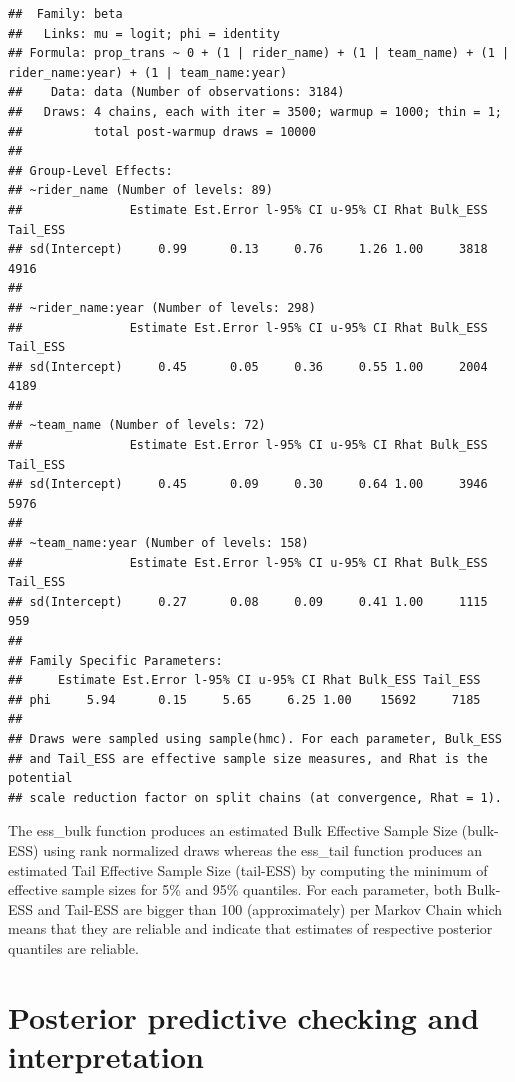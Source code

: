 \documentclass[
]{article}
\begin{document}
\begin{verbatim}
##  Family: beta 
##   Links: mu = logit; phi = identity 
## Formula: prop_trans ~ 0 + (1 | rider_name) + (1 | team_name) + (1 | rider_name:year) + (1 | team_name:year) 
##    Data: data (Number of observations: 3184) 
##   Draws: 4 chains, each with iter = 3500; warmup = 1000; thin = 1;
##          total post-warmup draws = 10000
## 
## Group-Level Effects: 
## ~rider_name (Number of levels: 89) 
##               Estimate Est.Error l-95% CI u-95% CI Rhat Bulk_ESS Tail_ESS
## sd(Intercept)     0.99      0.13     0.76     1.26 1.00     3818     4916
## 
## ~rider_name:year (Number of levels: 298) 
##               Estimate Est.Error l-95% CI u-95% CI Rhat Bulk_ESS Tail_ESS
## sd(Intercept)     0.45      0.05     0.36     0.55 1.00     2004     4189
## 
## ~team_name (Number of levels: 72) 
##               Estimate Est.Error l-95% CI u-95% CI Rhat Bulk_ESS Tail_ESS
## sd(Intercept)     0.45      0.09     0.30     0.64 1.00     3946     5976
## 
## ~team_name:year (Number of levels: 158) 
##               Estimate Est.Error l-95% CI u-95% CI Rhat Bulk_ESS Tail_ESS
## sd(Intercept)     0.27      0.08     0.09     0.41 1.00     1115      959
## 
## Family Specific Parameters: 
##     Estimate Est.Error l-95% CI u-95% CI Rhat Bulk_ESS Tail_ESS
## phi     5.94      0.15     5.65     6.25 1.00    15692     7185
## 
## Draws were sampled using sample(hmc). For each parameter, Bulk_ESS
## and Tail_ESS are effective sample size measures, and Rhat is the potential
## scale reduction factor on split chains (at convergence, Rhat = 1).
\end{verbatim}

The ess\_bulk function produces an estimated Bulk Effective Sample Size
(bulk-ESS) using rank normalized draws whereas the ess\_tail function
produces an estimated Tail Effective Sample Size (tail-ESS) by computing
the minimum of effective sample sizes for 5\% and 95\% quantiles. For
each parameter, both Bulk-ESS and Tail-ESS are bigger than 100
(approximately) per Markov Chain which means that they are reliable and
indicate that estimates of respective posterior quantiles are reliable.

\hypertarget{posterior-predictive-checking-and-interpretation}{%
\section{Posterior predictive checking and
interpretation}\label{posterior-predictive-checking-and-interpretation}}
\end{document}
